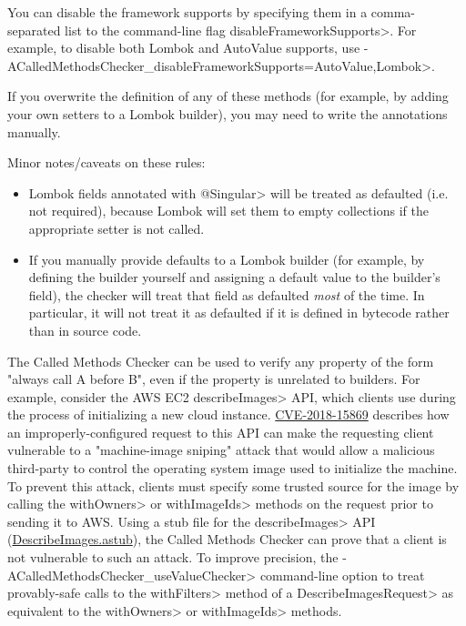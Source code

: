 You can disable the framework supports by specifying them in a comma-separated list to the
command-line flag \<disableFrameworkSupports>.  For example, to disable both Lombok and AutoValue supports,
use \<-ACalledMethodsChecker\_disableFrameworkSupports=AutoValue,Lombok>.

If you overwrite the definition of any of these methods (for example, by adding your own setters to
a Lombok builder), you may need to write the annotations manually.

Minor notes/caveats on these rules:
\begin{itemize}
\item Lombok fields annotated with \<@Singular> will be treated as defaulted (i.e. not required), because
Lombok will set them to empty collections if the appropriate setter is not called.
\item If you manually provide defaults to a Lombok builder (for example, by defining the builder yourself
and assigning a default value to the builder's field), the checker will treat that field as defaulted
\emph{most} of the time. In particular, it will not treat it as defaulted if it is defined in bytecode rather
than in source code.
\end{itemize}


The Called Methods Checker can be used to verify any property of the form "always call A before B", even
if the property is unrelated to builders. For example, consider the AWS EC2 \<describeImages> API, which
clients use during the process of initializing a new cloud instance.
\href{https://cve.mitre.org/cgi-bin/cvename.cgi?name=CVE-2018-15869}{CVE-2018-15869} describes how an
improperly-configured request to this API can make the requesting client vulnerable to a "machine-image sniping"
attack that would allow a malicious third-party to control the operating system image used to initialize the
machine. To prevent this attack, clients must specify some trusted source for the image by calling the
\<withOwners> or \<withImageIds> methods on the request prior to sending it to AWS. Using a stub file for the
\<describeImages> API
(\href{https://github.com/typetools/checker-framework/blob/master/checker/src/main/java/org/checkerframework/calledmethods/DescribeImages.astub}{DescribeImages.astub}),
the Called Methods Checker can prove that a client is not vulnerable to such an attack. To improve precision,
the \<-ACalledMethodsChecker\_useValueChecker> command-line option to treat provably-safe calls to the \<withFilters>
method of a \<DescribeImagesRequest> as equivalent to the \<withOwners> or \<withImageIds> methods.
